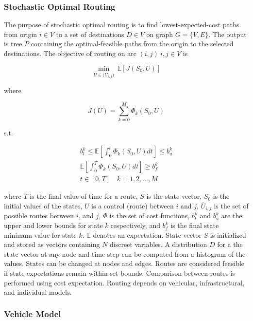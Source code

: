 \documentclass[11pt]{article}
\begin{document}
\begin{multicols}{2}
\subsubsection*{Stochastic Optimal Routing}

The purpose of stochastic optimal routing is to find lowest-expected-cost paths from origin $i \in V$ to a set of destinations $D \in V$ on graph $G = \{V, E\}$. The output is tree $P$ containing the optimal-feasible paths from the origin to the selected destinations. The objective of routing on arc $(i,j)\ i, j \in V$ is

\begin{equation}
	\min_{U \in \overline({U}_{i,j})}\ \mathbb{E}[J(S_0, U)]
\end{equation}

where

\begin{equation}
	J(U) = \sum_{k = 0}^M \Phi_k(S_0, U)
\end{equation}

s.t.

\begin{gather}	
	b^k_l \leq \mathbb{E}\left[\int_0^t \Phi_k(S_0, U)dt\right] \leq b^k_u\\
	\mathbb{E}\left[\int_0^T \Phi_k(S_0, U)dt\right] \geq b^k_f\\
	 t \in [0, T]\quad k = 1, 2, \dots, M
\end{gather}

\noindent where $T$ is the final value of time for a route, $S$ is the state vector, $S_0$ is the initial values of the states, $U$ is a control (route) between $i$ and $j$, $\overline{U}_{i,j}$ is the set of possible routes between $i$, and $j$, $\Phi$ is the set of cost functions, $b^k_l$ and $b^k_u$ are the upper and lower bounds for state $k$ respectively, and $b^k_f$ is the final state minimum value for state $k$. $\mathbb{E}$ denotes an expectation. State vector $S$ is initialized and stored as vectors containing $N$ discreet variables. A distribution $D$ for a the state vector at any node and time-step can be computed from a histogram of the values. States can be changed at nodes and edges. Routes are considered feasible if state expectations remain within set bounds. Comparison between routes is performed using cost expectation. Routing depends on vehicular, infrastructural, and individual models.


\subsubsection*{Vehicle Model}


\end{multicols}
\end{document}
